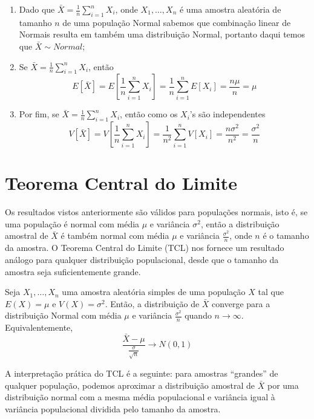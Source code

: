 \documentclass[
]{book}
\providecommand{\tightlist}{%
  \setlength{\itemsep}{0pt}\setlength{\parskip}{0pt}}
\begin{document}
\begin{enumerate}
\def\labelenumi{\arabic{enumi}.}
\tightlist
\item
  Dado que \(\bar X = \frac{1}{n}\sum_{i=1}^{n}X_i\), onde \(X_1,\ldots,X_n\) é uma amostra aleatória de tamanho \(n\) de uma população Normal sabemos que combinação linear de Normais resulta em também uma distribuição Normal, portanto daqui temos que \(\bar X \sim Normal\);
\item
  Se \(\bar X = \frac{1}{n}\sum_{i=1}^{n}X_i\), então \[E\left[\bar X\right] = E\left[\frac{1}{n}\sum_{i=1}^{n}X_i\right]=\frac{1}{n}\sum_{i=1}^{n}E\left[X_i\right]=\frac{n\mu}{n}=\mu\]
\item
  Por fim, se \(\bar X = \frac{1}{n}\sum_{i=1}^{n}X_i\), então como os \(X_i\)'s são independentes \[V \left[\bar X\right] = V\left[\frac{1}{n}\sum_{i=1}^{n}X_i\right]=\frac{1}{n^2}\sum_{i=1}^{n}V\left[X_i\right]=\frac{n\sigma^2}{n^2}=\frac{\sigma^2}{n}\]
\end{enumerate}

\hypertarget{teorema-central-do-limite}{%
\section{Teorema Central do Limite}\label{teorema-central-do-limite}}

Os resultados vistos anteriormente são válidos para populações normais, isto é, se uma população é normal com média \(\mu\) e variância \(\sigma^2\), então a distribuição amostral de \(\bar X\) é também normal com média \(\mu\) e variância \(\frac{\sigma^2}{n}\), onde \(n\) é o tamanho da amostra. O Teorema Central do Limite (TCL) nos fornece um resultado análogo para qualquer distribuição populacional, desde que o tamanho da amostra seja suficientemente grande.

Seja \(X_1,\ldots,X_n\) uma amostra aleatória simples de uma população \(X\) tal que \(E(X)=\mu\) e \(V(X)=\sigma^2\). Então, a distribuição de \(\bar X\) converge para a distribuição Normal com média \(\mu\) e variância \(\frac{\sigma^2}{n}\) quando \(n\rightarrow \infty\). Equivalentemente, \[\frac{\bar X-\mu}{\frac{\sigma}{\sqrt{n}}}\rightarrow N(0,1)\]

A interpretação prática do TCL é a seguinte: para amostras ``grandes'' de qualquer população, podemos aproximar a distribuição amostral de \(\bar X\) por uma distribuição normal com a mesma média populacional e variância igual à variância populacional dividida pelo tamanho da amostra.
\end{document}
